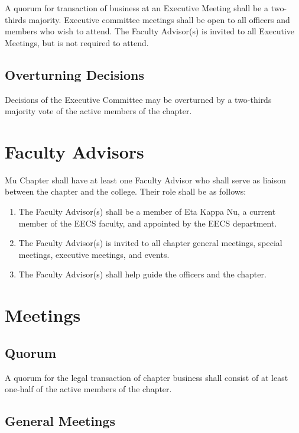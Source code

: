 \documentclass[11pt]{article}
\begin{document}
A quorum for transaction of business at an Executive Meeting shall be a two-thirds majority.
Executive committee meetings shall be open to all officers and members who wish to attend.
The Faculty Advisor(s) is invited to all Executive Meetings, but is not required to attend.

\subsection{Overturning Decisions}
\label{sec:org0cf1c6b}

Decisions of the Executive Committee may be overturned by a two-thirds majority vote of the active members of the chapter.
\section{Faculty Advisors}
\label{sec:orgdc205e1}

Mu Chapter shall have at least one Faculty Advisor who shall serve as liaison between the chapter and the college.
Their role shall be as follows:

\begin{enumerate}
\item The Faculty Advisor(s) shall be a member of Eta Kappa Nu, a current member of the EECS faculty, and appointed by the EECS department.
\item The Faculty Advisor(s) is invited to all chapter general meetings, special meetings, executive meetings, and events.
\item The Faculty Advisor(s) shall help guide the officers and the chapter.
\end{enumerate}
\section{Meetings}
\label{sec:orgae8d606}

\subsection{Quorum}
\label{sec:orgc4c9997}

A quorum for the legal transaction of chapter business shall consist of at least one-half of the active members of the chapter.

\subsection{General Meetings}
\label{sec:orgb1f45fe}
\end{document}

